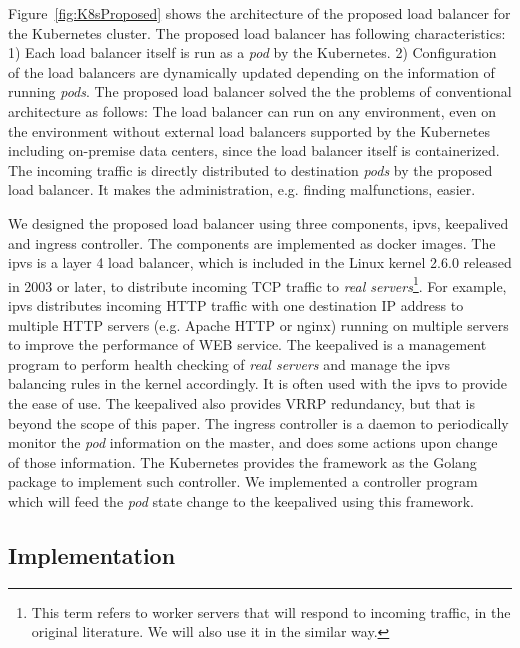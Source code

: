 Figure~\ref{fig:K8sProposed} shows the architecture of the proposed load balancer for the Kubernetes cluster. 
The proposed load balancer has following characteristics:
1) Each load balancer itself is run as a {\em pod} by the Kubernetes. 
2) Configuration of the load balancers are dynamically updated depending on the information of running {\em pods}.
The proposed load balancer solved the the problems of conventional architecture as follows:
The load balancer can run on any environment, even on the environment without external load balancers supported by the Kubernetes including on-premise data centers, since the load balancer itself is containerized. The incoming traffic is directly distributed to destination {\em pods} by the proposed load balancer. It makes the administration, e.g. finding malfunctions, easier.

We designed the proposed load balancer using three components, ipvs, keepalived and ingress controller. 
The components are implemented as docker images.
The ipvs is a layer 4 load balancer, which is included in the Linux kernel 2.6.0 released in 2003 or later, 
to distribute incoming TCP traffic to {\em real servers}\footnote{This term refers to worker servers that will respond to incoming traffic, 
in the original literature\cite{Zhang2000}. We will also use it in the similar way.}\cite{Zhang2000}. 
For example, ipvs distributes incoming HTTP traffic with one destination IP address to multiple HTTP servers 
(e.g. Apache HTTP or nginx) running on multiple servers to improve the performance of WEB service.
The keepalived is a management program to perform health checking of {\em real servers}
and manage the ipvs balancing rules in the kernel accordingly.
It is often used with the ipvs to provide the ease of use.
The keepalived also provides VRRP\cite{hinden2004virtual} redundancy, but that is beyond the scope of this paper.
The ingress controller is a daemon to periodically monitor the {\em pod} information on the master, 
and does some actions upon change of those information.
The Kubernetes provides the framework as the Golang package to implement such controller. 
We implemented a controller program which will feed the {\em pod} state change to the keepalived 
using this framework. 


\subsection{Implementation}\label{Implementation}

